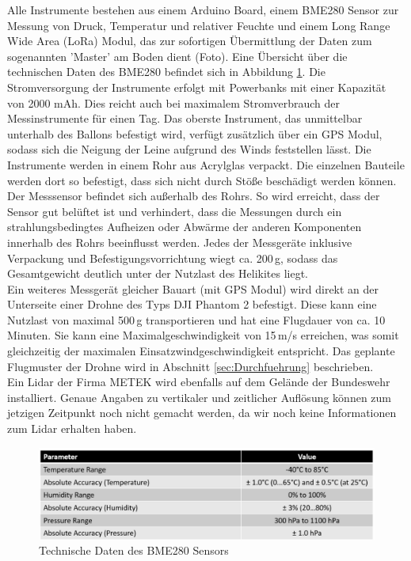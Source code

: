 \documentclass[a4paper,11pt,DIV=calc,tablecaptionabove,headinclude,twoside]{article}
\begin{document}
Alle Instrumente bestehen aus einem Arduino Board, einem BME280 Sensor zur Messung von Druck, Temperatur und relativer Feuchte und einem Long Range Wide Area (LoRa) Modul, das zur sofortigen Übermittlung der Daten zum sogenannten 'Master' am Boden dient (Foto). Eine Übersicht über die technischen Daten des BME280 befindet sich in Abbildung \ref{BME_280}. Die Stromversorgung der Instrumente erfolgt mit Powerbanks mit einer Kapazität von 2000 mAh. Dies reicht auch bei maximalem Stromverbrauch der Messinstrumente für einen Tag. Das oberste Instrument, das unmittelbar unterhalb des Ballons befestigt wird, verfügt zusätzlich über ein GPS Modul, sodass sich die Neigung der Leine aufgrund des Winds feststellen lässt. Die Instrumente werden in einem Rohr aus Acrylglas verpackt. Die einzelnen Bauteile werden dort so befestigt, dass sich nicht durch Stöße beschädigt werden können. Der Messsensor befindet sich außerhalb des Rohrs. So wird erreicht, dass der Sensor gut belüftet ist und verhindert, dass die Messungen durch ein strahlungsbedingtes Aufheizen oder Abwärme der anderen Komponenten innerhalb des Rohrs beeinflusst werden.  
Jedes der Messgeräte inklusive Verpackung und Befestigungsvorrichtung wiegt ca. 200\,g, sodass das Gesamtgewicht deutlich unter der Nutzlast des Helikites liegt.\\
   
Ein weiteres Messgerät gleicher Bauart (mit GPS Modul) wird direkt an der Unterseite einer Drohne des Typs DJI Phantom 2 befestigt. Diese kann eine Nutzlast von maximal 500\,g transportieren und hat eine Flugdauer von ca. 10 Minuten. Sie kann eine Maximalgeschwindigkeit von 15\,m/s erreichen, was somit gleichzeitig der maximalen Einsatzwindgeschwindigkeit entspricht. Das geplante Flugmuster der Drohne wird in Abschnitt \ref{sec:Durchfuehrung} beschrieben. \\

Ein Lidar der Firma METEK wird ebenfalls auf dem Gelände der Bundeswehr installiert. Genaue Angaben zu vertikaler und zeitlicher Auflösung können zum jetzigen Zeitpunkt noch nicht gemacht werden, da wir noch keine Informationen zum Lidar erhalten haben.  


\begin{figure}
\centering
\includegraphics[width=\textwidth]{BME_280_technische_Daten.png}
\caption{Technische Daten des BME280 Sensors}
\label{BME_280}
\end{figure}
\end{document}
